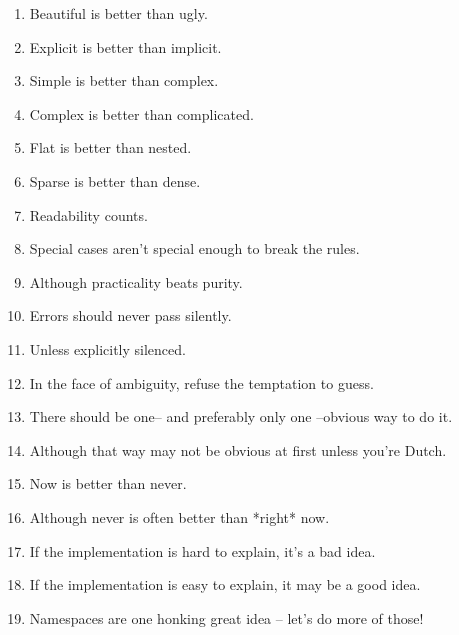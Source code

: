 \documentclass{sciposter}
\begin{document}
\begin{multicols}{3}
\begin{enumerate}
\item Beautiful is better than ugly.
\item     Explicit is better than implicit.
\item     Simple is better than complex.
\item     Complex is better than complicated.
\item     Flat is better than nested.
\item     Sparse is better than dense.
\item     Readability counts.
\item     Special cases aren't special enough to break the rules.
\item     Although practicality beats purity.
\item     Errors should never pass silently.
\item     Unless explicitly silenced.
\item     In the face of ambiguity, refuse the temptation to guess.
\item     There should be one-- and preferably only one --obvious way to do it.
\item     Although that way may not be obvious at first unless you're Dutch.
\item     Now is better than never.
\item     Although never is often better than *right* now.
\item     If the implementation is hard to explain, it's a bad idea.
\item     If the implementation is easy to explain, it may be a good idea.
\item     Namespaces are one honking great idea -- let's do more of those!
\end{enumerate}



\end{multicols}
\end{document}
